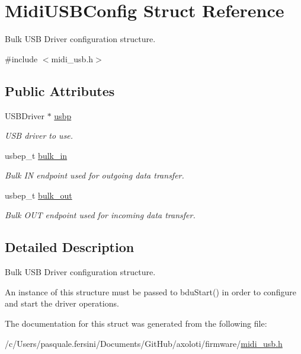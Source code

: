 \hypertarget{structMidiUSBConfig}{}\section{Midi\+U\+S\+B\+Config Struct Reference}
\label{structMidiUSBConfig}


Bulk U\+SB Driver configuration structure.  




{\ttfamily \#include $<$midi\+\_\+usb.\+h$>$}

\subsection*{Public Attributes}
\begin{DoxyCompactItemize}
\item 
U\+S\+B\+Driver $\ast$ \hyperlink{structMidiUSBConfig_a790053d1fd7606f3b36d0935c65ade23}{usbp}\hypertarget{structMidiUSBConfig_a790053d1fd7606f3b36d0935c65ade23}{}\label{structMidiUSBConfig_a790053d1fd7606f3b36d0935c65ade23}

\begin{DoxyCompactList}\small\item\em U\+SB driver to use. \end{DoxyCompactList}\item 
usbep\+\_\+t \hyperlink{structMidiUSBConfig_af491dd47cc82b3ec77af8f9b00e5e939}{bulk\+\_\+in}\hypertarget{structMidiUSBConfig_af491dd47cc82b3ec77af8f9b00e5e939}{}\label{structMidiUSBConfig_af491dd47cc82b3ec77af8f9b00e5e939}

\begin{DoxyCompactList}\small\item\em Bulk IN endpoint used for outgoing data transfer. \end{DoxyCompactList}\item 
usbep\+\_\+t \hyperlink{structMidiUSBConfig_a8b878c797ca1c216baf2ecf6626ed919}{bulk\+\_\+out}\hypertarget{structMidiUSBConfig_a8b878c797ca1c216baf2ecf6626ed919}{}\label{structMidiUSBConfig_a8b878c797ca1c216baf2ecf6626ed919}

\begin{DoxyCompactList}\small\item\em Bulk O\+UT endpoint used for incoming data transfer. \end{DoxyCompactList}\end{DoxyCompactItemize}


\subsection{Detailed Description}
Bulk U\+SB Driver configuration structure. 

An instance of this structure must be passed to {\ttfamily bdu\+Start()} in order to configure and start the driver operations. 

The documentation for this struct was generated from the following file\+:\begin{DoxyCompactItemize}
\item 
/c/\+Users/pasquale.\+fersini/\+Documents/\+Git\+Hub/axoloti/firmware/\hyperlink{midi__usb_8h}{midi\+\_\+usb.\+h}\end{DoxyCompactItemize}
